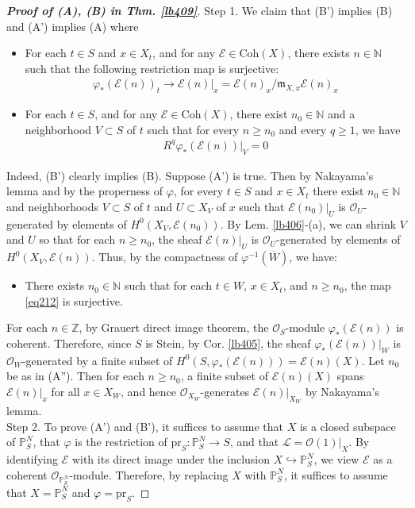 \documentclass[12pt,b5paper,notitlepage]{report}
\theoremstyle{definition}
\theoremstyle{plain}
\newcommand{\ovl}{\overline}
\newcommand{\scr}{\mathscr}
\newcommand{\Nbb}{\mathbb N}
\newcommand{\Zbb}{\mathbb Z}
\newcommand{\Pbb}{\mathbb P}
\newcommand{\pr}{\mathrm {pr}}
\newcommand{\mk}{\mathfrak m}
\newcommand{\Coh}{\mathrm{Coh}}
\numberwithin{equation}{section}
\begin{document}
\begin{proof}[\textbf{Proof of (A), (B) in Thm. \ref{lb409}}]
Step 1. We claim that (B') implies (B) and (A') implies (A) where
\begin{itemize}
\item[(A')] For each $t\in S$ and $x\in X_t$, and for any $\scr E\in\Coh(X)$, there exists $n\in\Nbb$ such that the following restriction map is surjective:
\begin{align}
\varphi_*(\scr E(n))_t\longrightarrow \scr E(n)|_x=\scr E(n)_x/\mk_{X,x}\scr E(n)_x  \label{eq212}
\end{align}
\item[(B')] For each $t\in S$, and for any $\scr E\in\Coh(X)$, there exist $n_0\in\Nbb$ and a neighborhood $V\subset S$ of $t$ such that for every $n\geq n_0$ and every $q\geq1$, we have
\begin{align*}
R^q\varphi_*(\scr E(n))\big|_V=0
\end{align*}
\end{itemize}
Indeed, (B') clearly implies (B). Suppose (A') is true. Then by Nakayama's lemma and by the properness of $\varphi$, for every $t\in S$ and $x\in X_t$ there exist $n_0\in\Nbb$ and neighborhoods $V\subset S$ of $t$ and $U\subset X_V$ of $x$ such that $\scr E(n_0)|_U$ is $\scr O_U$-generated by elements of $H^0(X_V,\scr E(n_0))$. By Lem. \ref{lb406}-(a), we can shrink $V$ and $U$ so that for each $n\geq n_0$, the sheaf $\scr E(n)|_U$ is $\scr O_U$-generated by elements of $H^0(X_V,\scr E(n))$. Thus, by the compactness of $\varphi^{-1}(\ovl W)$, we have:
\begin{itemize}
\item[(A'')] There exists $n_0\in\Nbb$ such that for each $t\in W$, $x\in X_t$, and $n\geq n_0$, the map \eqref{eq212} is surjective.
\end{itemize}

For each $n\in\Zbb$, by Grauert direct image theorem, the $\scr O_S$-module $\varphi_*(\scr E(n))$ is coherent. Therefore, since $S$ is Stein, by Cor. \ref{lb405}, the sheaf $\varphi_*(\scr E(n))|_W$ is $\scr O_W$-generated by a finite subset of $H^0(S,\varphi_*(\scr E(n)))=\scr E(n)(X)$. Let $n_0$ be as in (A''). Then for each $n\geq n_0$,  a finite subset of $\scr E(n)(X)$ spans $\scr E(n)|_x$ for all $x\in X_W$, and hence $\scr O_{X_W}$-generates $\scr E(n)|_{X_W}$ by Nakayama's lemma.\\[-1ex]



Step 2. To prove (A') and (B'), it suffices to assume that $X$ is a closed subspace of $\Pbb^N_S$, that $\varphi$ is the restriction of $\pr_S:\Pbb^N_S\rightarrow S$, and that $\scr L=\scr O(1)|_X$.  By identifying $\scr E$ with its direct image under the inclusion $X\hookrightarrow\Pbb^N_S$, we view $\scr E$ as a coherent $\scr O_{\Pbb^N_S}$-module. Therefore, by replacing $X$ with $\Pbb^N_S$, it suffices to assume that $X=\Pbb^N_S$ and $\varphi=\pr_S$.


\end{proof}
\end{document}
